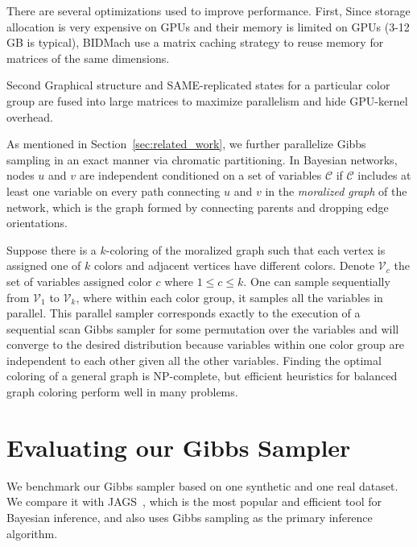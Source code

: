 \documentclass{article} %
\begin{document}
There are several optimizations used to improve performance.  First, Since
storage allocation is very expensive on GPUs and their memory is
limited on GPUs (3-12 GB is typical), BIDMach use a matrix caching
strategy to reuse memory for matrices of the same
dimensions.

Second Graphical structure and SAME-replicated states for a particular
color group are fused into large matrices to maximize parallelism and
hide GPU-kernel overhead.

As mentioned in Section~\ref{sec:related_work}, we further parallelize Gibbs sampling in an
exact manner via chromatic partitioning. In Bayesian networks, nodes $u$ and $v$ are independent
conditioned on a set of variables $\mathcal{C}$ if $\mathcal{C}$ includes at least one variable on
every path connecting $u$ and $v$ in the \emph{moralized graph} of the network, which is the graph
formed by connecting parents and dropping edge orientations.

Suppose there is a $k$-coloring of the moralized graph such that each vertex is assigned one of $k$
colors and adjacent vertices have different colors. Denote $\mathcal{V}_c$ the set of variables
assigned color $c$ where $1 \leq c \leq k$. One can sample sequentially from $\mathcal{V}_1$ to
$\mathcal{V}_k$, where within each color group, it samples all the variables in parallel. This
parallel sampler corresponds exactly to the execution of a sequential scan Gibbs sampler for some
permutation over the variables and will converge to the desired distribution because variables
within one color group are independent to each other given all the other variables. Finding the
optimal coloring of a general graph is NP-complete, but efficient heuristics for balanced graph
coloring perform well in many problems.




\section{Evaluating our Gibbs Sampler}\label{sec:experiments}

We benchmark our Gibbs sampler based on one synthetic and one real dataset. We compare it with
JAGS~\citep{JAGS2003}, which is the most popular and efficient tool for Bayesian inference, and also
uses Gibbs sampling as the primary inference algorithm. 

\end{document}

